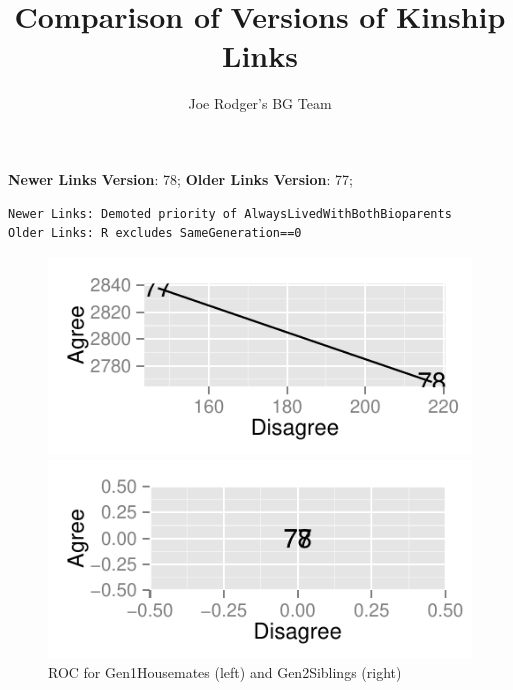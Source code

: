 \documentclass[a4paper]{article}\usepackage[]{graphicx}\usepackage[]{color}
\title{Comparison of Versions of Kinship Links}
\author{Joe Rodger's BG Team}
\makeatletter
\def\maxwidth{ %
  \ifdim\Gin@nat@width>\linewidth
    \linewidth
  \else
    \Gin@nat@width
  \fi
}
\newenvironment{kframe}{%
 \def\at@end@of@kframe{}%
 \ifinner\ifhmode%
  \def\at@end@of@kframe{\end{minipage}}%
  \begin{minipage}{\columnwidth}%
 \fi\fi%
 \def\FrameCommand##1{\hskip\@totalleftmargin \hskip-\fboxsep
 \colorbox{shadecolor}{##1}\hskip-\fboxsep
     \hskip-\linewidth \hskip-\@totalleftmargin \hskip\columnwidth}%
 \MakeFramed {\advance\hsize-\width
   \@totalleftmargin\z@ \linewidth\hsize
   \@setminipage}}%
 {\par\unskip\endMakeFramed%
 \at@end@of@kframe}
\newenvironment{knitrout}{}{} %
\makeatother
\begin{document}
\maketitle

\setlength{\parindent}{0pt}%







\textbf{Newer Links Version}: 78;
\textbf{Older Links Version}: 77;

\begin{knitrout}
\color{fgcolor}\begin{kframe}
\begin{verbatim}
Newer Links: Demoted priority of AlwaysLivedWithBothBioparents
Older Links: R excludes SameGeneration==0
\end{verbatim}
\end{kframe}
\end{knitrout}


\begin{figure}[htbp]
\begin{knitrout}
\color{fgcolor}
\includegraphics[width=\maxwidth]{figure/unnamed-chunk-31} 

\includegraphics[width=\maxwidth]{figure/unnamed-chunk-32} 

\end{knitrout}

\caption{ROC for Gen1Housemates (left) and Gen2Siblings (right)}
\end{figure}
\end{document}

